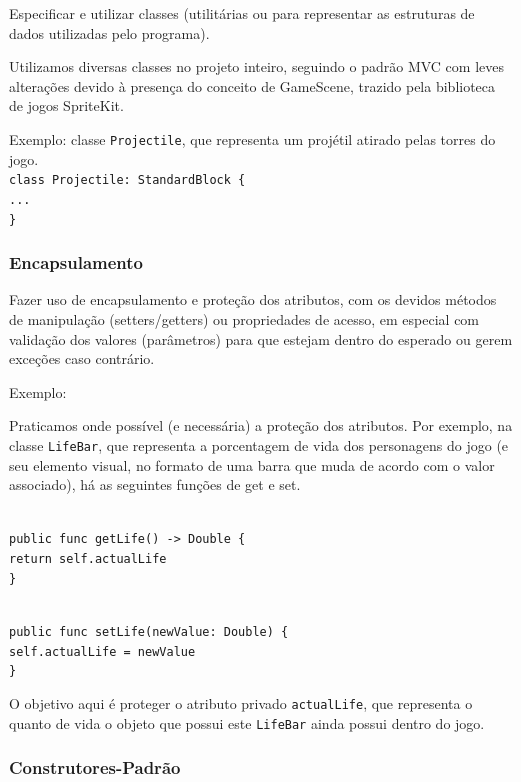 \documentclass[rel_mlp]{iiufrgs}
\newcommand\tab[1][1cm]{\hspace*{#1}}
\begin{document}
Especificar e utilizar classes (utilitárias ou para representar as estruturas de dados utilizadas pelo programa).

Utilizamos diversas classes no projeto inteiro, seguindo o padrão MVC com leves alterações devido à presença do conceito de GameScene, trazido pela biblioteca de jogos SpriteKit.

Exemplo: classe \texttt{Projectile}, que representa um projétil atirado pelas torres do jogo.
\texttt{\\class Projectile: StandardBlock \{\\\tab ...\\\}}


\subsubsection{Encapsulamento}

Fazer uso de encapsulamento e proteção dos atributos, com os devidos métodos de manipulação (setters/getters) ou propriedades de acesso, em especial com validação dos valores (parâmetros) para que estejam dentro do esperado ou gerem exceções caso contrário.

Exemplo:

Praticamos onde possível (e necessária) a proteção dos atributos. Por exemplo, na classe \texttt{LifeBar}, que representa a porcentagem de vida dos personagens do jogo (e seu elemento visual, no formato de uma barra que muda de acordo com o valor associado), há as seguintes funções de get e set.

\texttt{\\public func getLife() -> Double \{\\\tab return self.actualLife\\\}}

\texttt{\\public func setLife(newValue: Double) \{\\\tab self.actualLife = newValue\\\}}
    
O objetivo aqui é proteger o atributo privado \texttt{actualLife}, que representa o quanto de vida o objeto que possui este \texttt{LifeBar} ainda possui dentro do jogo.


\subsubsection{Construtores-Padrão}
\end{document}
